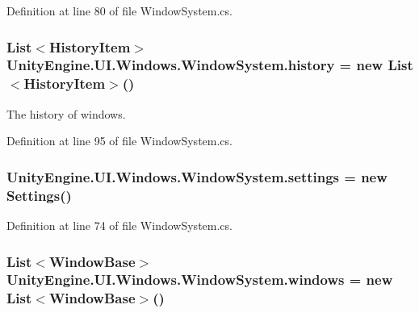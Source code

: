 Definition at line 80 of file Window\+System.\+cs.

\hypertarget{class_unity_engine_1_1_u_i_1_1_windows_1_1_window_system_a40452df5c3dc4b7c53c9fe505166fac3}{}
\subsubsection[{history}]{\setlength{\rightskip}{0pt plus 5cm}List$<${\bf History\+Item}$>$ Unity\+Engine.\+U\+I.\+Windows.\+Window\+System.\+history = new List$<${\bf History\+Item}$>$()}\label{class_unity_engine_1_1_u_i_1_1_windows_1_1_window_system_a40452df5c3dc4b7c53c9fe505166fac3}


The history of windows. 



Definition at line 95 of file Window\+System.\+cs.

\hypertarget{class_unity_engine_1_1_u_i_1_1_windows_1_1_window_system_a9684d30df14f900cca74b5629557379c}{}
\subsubsection[{settings}]{ Unity\+Engine.\+U\+I.\+Windows.\+Window\+System.\+settings = new {\bf Settings}()}\label{class_unity_engine_1_1_u_i_1_1_windows_1_1_window_system_a9684d30df14f900cca74b5629557379c}


Definition at line 74 of file Window\+System.\+cs.

\hypertarget{class_unity_engine_1_1_u_i_1_1_windows_1_1_window_system_a3382b0e8d83b6c4dda24210aab3619ad}{}
\subsubsection[{windows}]{\setlength{\rightskip}{0pt plus 5cm}List$<${\bf Window\+Base}$>$ Unity\+Engine.\+U\+I.\+Windows.\+Window\+System.\+windows = new List$<${\bf Window\+Base}$>$()}\label{class_unity_engine_1_1_u_i_1_1_windows_1_1_window_system_a3382b0e8d83b6c4dda24210aab3619ad}


